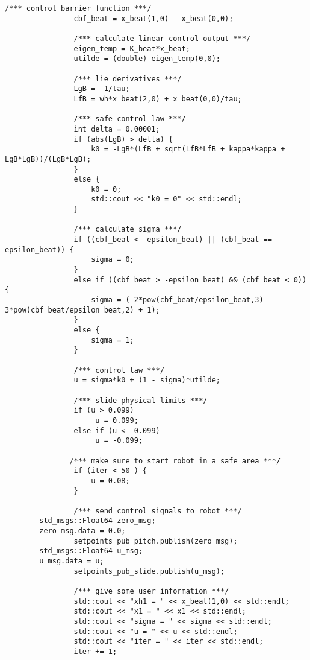 \begin{lstlisting}[language=gedit]
                /*** control barrier function ***/
                cbf_beat = x_beat(1,0) - x_beat(0,0);

                /*** calculate linear control output ***/
                eigen_temp = K_beat*x_beat;
                utilde = (double) eigen_temp(0,0);
            
                /*** lie derivatives ***/
                LgB = -1/tau;
                LfB = wh*x_beat(2,0) + x_beat(0,0)/tau;

                /*** safe control law ***/
                int delta = 0.00001;
                if (abs(LgB) > delta) {
                    k0 = -LgB*(LfB + sqrt(LfB*LfB + kappa*kappa + LgB*LgB))/(LgB*LgB);
                }
                else {
                    k0 = 0;
                    std::cout << "k0 = 0" << std::endl;
                }          
 
                /*** calculate sigma ***/
                if ((cbf_beat < -epsilon_beat) || (cbf_beat == -epsilon_beat)) {
                    sigma = 0;
                }
                else if ((cbf_beat > -epsilon_beat) && (cbf_beat < 0)) {
                    sigma = (-2*pow(cbf_beat/epsilon_beat,3) - 3*pow(cbf_beat/epsilon_beat,2) + 1);
                }
                else {
                    sigma = 1;
                }
               
                /*** control law ***/
                u = sigma*k0 + (1 - sigma)*utilde;

                /*** slide physical limits ***/
                if (u > 0.099)
                     u = 0.099;
                else if (u < -0.099)
                     u = -0.099;

               /*** make sure to start robot in a safe area ***/
                if (iter < 50 ) {
                    u = 0.08;
                }
 
                /*** send control signals to robot ***/
		std_msgs::Float64 zero_msg;
		zero_msg.data = 0.0;
                setpoints_pub_pitch.publish(zero_msg);
		std_msgs::Float64 u_msg;
		u_msg.data = u;
                setpoints_pub_slide.publish(u_msg);

                /*** give some user information ***/
                std::cout << "xh1 = " << x_beat(1,0) << std::endl;
                std::cout << "x1 = " << x1 << std::endl;
                std::cout << "sigma = " << sigma << std::endl;
                std::cout << "u = " << u << std::endl;
                std::cout << "iter = " << iter << std::endl;               
                iter += 1;


\end{lstlisting}
